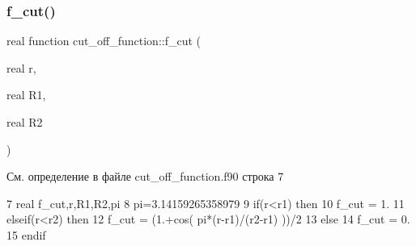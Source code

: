 \subsubsection{\texorpdfstring{f\+\_\+cut()}{f\_cut()}}
{\footnotesize\ttfamily real function cut\+\_\+off\+\_\+function\+::f\+\_\+cut (\begin{DoxyParamCaption}\item[{real}]{r,  }\item[{real}]{R1,  }\item[{real}]{R2 }\end{DoxyParamCaption})}



См. определение в файле cut\+\_\+off\+\_\+function.\+f90 строка 7


\begin{DoxyCode}
7     \textcolor{keywordtype}{real} f\_cut,r,R1,R2,pi
8     pi=3.14159265358979
9     \textcolor{keywordflow}{if}(r<r1) \textcolor{keywordflow}{then}
10         f\_cut = 1.
11     \textcolor{keywordflow}{elseif}(r<r2) \textcolor{keywordflow}{then}
12         f\_cut = (1.+cos( pi*(r-r1)/(r2-r1) ))/2
13     \textcolor{keywordflow}{else}
14         f\_cut = 0.
15 \textcolor{keywordflow}{    endif}
\end{DoxyCode}
